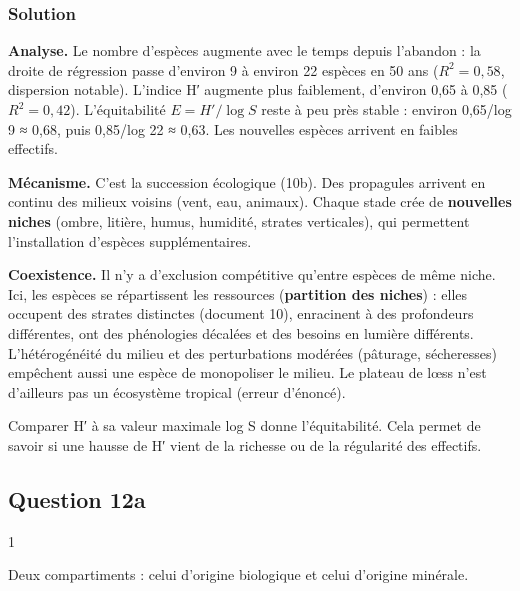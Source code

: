\documentclass[11pt,a4paper]{article}
\begin{document}
\hypertarget{solution-30}{%
\subsubsection{Solution}\label{solution-30}}

\textbf{Analyse.} Le nombre d'espèces augmente avec le temps depuis l'abandon : la droite de régression passe d'environ 9 à environ 22 espèces en 50 ans (\(R^2=0{,}58\), dispersion notable). L'indice H′ augmente plus faiblement, d'environ 0,65 à 0,85 (\(R^2=0{,}42\)). L'équitabilité \(E=H'/\log S\) reste à peu près stable : environ 0,65/log 9 ≈ 0,68, puis 0,85/log 22 ≈ 0,63. Les nouvelles espèces arrivent en faibles effectifs.

\textbf{Mécanisme.} C'est la succession écologique (10b). Des propagules arrivent en continu des milieux voisins (vent, eau, animaux). Chaque stade crée de \textbf{nouvelles niches} (ombre, litière, humus, humidité, strates verticales), qui permettent l'installation d'espèces supplémentaires.

\textbf{Coexistence.} Il n'y a d'exclusion compétitive qu'entre espèces de même niche. Ici, les espèces se répartissent les ressources (\textbf{partition des niches}) : elles occupent des strates distinctes (document 10), enracinent à des profondeurs différentes, ont des phénologies décalées et des besoins en lumière différents. L'hétérogénéité du milieu et des perturbations modérées (pâturage, sécheresses) empêchent aussi une espèce de monopoliser le milieu. Le plateau de lœss n'est d'ailleurs pas un écosystème tropical (erreur d'énoncé).

\begin{methode}

Comparer H′ à sa valeur maximale log S donne l'équitabilité. Cela permet de savoir si une hausse de H′ vient de la richesse ou de la régularité des effectifs.

\end{methode}

\hypertarget{question-12a}{%
\subsection{Question 12a}\label{question-12a}}

\begin{indication}{1}

Deux compartiments : celui d'origine biologique et celui d'origine minérale.

\end{indication}
\end{document}
